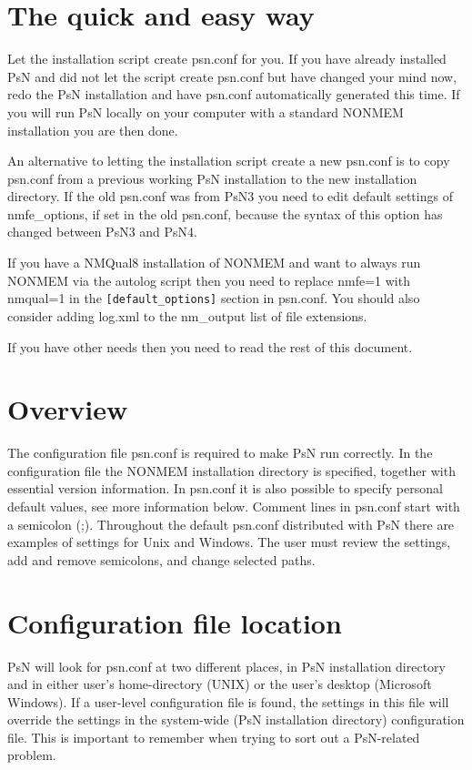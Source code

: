 


\maketitle

\section{The quick and easy way}
Let the installation script create psn.conf for you. If you have already installed PsN and did not let the script create psn.conf but have changed your mind now, redo the PsN installation and have psn.conf automatically generated this time. If you will run PsN locally on your computer with a standard NONMEM installation you are then done.

An alternative to letting the installation script create a new psn.conf is to copy 
psn.conf from a previous working PsN installation to the new installation directory.
If the old psn.conf was from PsN3 you need to edit 
default settings of nmfe\_options, if set in the old psn.conf, because the syntax of this option has
changed between PsN3 and PsN4.

If you have a NMQual8 installation of NONMEM and want to always run NONMEM via the autolog script then you need to replace nmfe=1 with nmqual=1 in the \verb|[default_options]| section in psn.conf. You should also consider adding log.xml to the
nm\_output list of file extensions.

If you have other needs then you need to read the rest of this document.

\section{Overview}
The configuration file psn.conf is required to make PsN run correctly. In the configuration file the NONMEM installation directory is specified, together with essential version information. In psn.conf it is also possible to specify personal default values, see more information below. Comment lines in psn.conf start with a semicolon (;). Throughout the default psn.conf distributed with PsN there are examples of settings for Unix and Windows. The user must review the settings, add and remove semicolons, and change selected paths.

\section{Configuration file location}
PsN will look for psn.conf at two different places, in PsN installation directory and in either
user's home-directory (UNIX) or the user's desktop (Microsoft Windows). If a user-level configuration file is found, the settings in this file will override the settings in the system-wide (PsN installation directory) configuration file. This is important to remember when trying to sort out a PsN-related problem.

